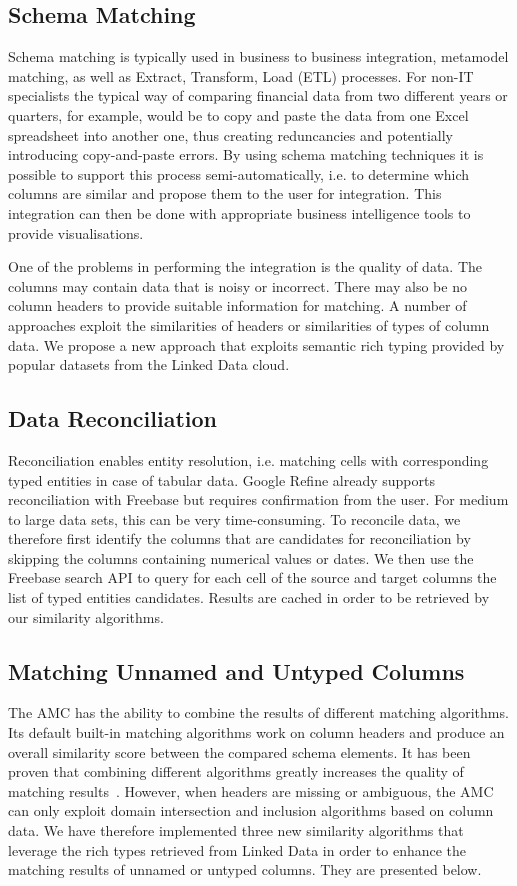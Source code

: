 \documentclass{sig-alternate}
\begin{document}
\subsection{Schema Matching }
Schema matching is typically used in business to business integration, metamodel matching, as well as Extract, Transform, Load (ETL) processes. For non-IT specialists the typical way of comparing financial data from two different years or quarters, for example, would be to copy and paste the data from one Excel spreadsheet into another one, thus creating reduncancies and potentially introducing copy-and-paste errors. By using schema matching techniques it is possible to support this process semi-automatically, i.e. to determine which columns are similar and propose them to the user for integration. This integration can then be done with appropriate business intelligence tools to provide visualisations.

One of the problems in performing the integration is the quality of data. The columns may contain data that is noisy or incorrect. There may also be no column headers to provide suitable information for matching. A number of approaches exploit the similarities of headers or similarities of types of column data. We propose a new approach that exploits semantic rich typing provided by popular datasets from the Linked Data cloud.


\subsection{Data Reconciliation}
Reconciliation enables entity resolution, i.e. matching cells with corresponding typed entities in case of tabular data. Google Refine already supports reconciliation with Freebase but requires confirmation from the user. For medium to large data sets, this can be very time-consuming. To reconcile data, we therefore first identify the columns that are candidates for reconciliation by skipping the columns containing numerical values or dates. We then use the Freebase search API to query for each cell of the source and target columns the list of typed entities candidates. Results are cached in order to be retrieved by our similarity algorithms.


\subsection{Matching Unnamed and Untyped Columns}
The AMC has the ability to combine the results of different matching algorithms. Its default built-in matching algorithms work on column headers and produce an overall similarity score between the compared schema elements. It has been proven that combining different algorithms greatly increases the quality of matching results~\cite{conf/icde/PeukertER12}\cite{conf/wise/StracciaT05}. However, when headers are missing or ambiguous, the AMC can only exploit domain intersection and inclusion algorithms based on column data. We have therefore implemented three new similarity algorithms that leverage the rich types retrieved from Linked Data in order to enhance the matching results of unnamed or untyped columns. They are presented below.
\end{document}
